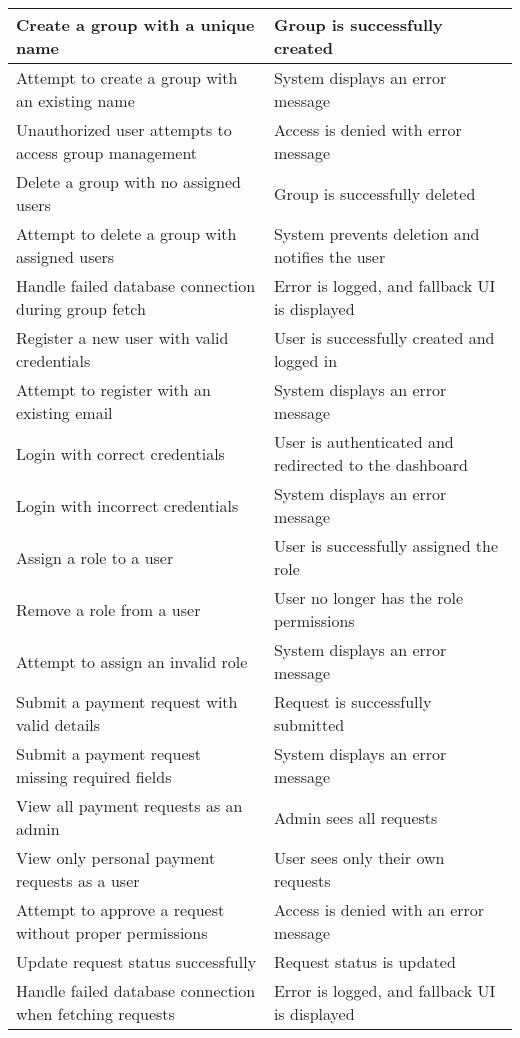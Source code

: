 \documentclass[12pt, titlepage]{article}
\begin{document}
\begin{longtable}{|p{}|p{}|}
  Create a group with a unique name & Group is successfully created \\
  \hline
  Attempt to create a group with an existing name & System displays an error message \\
  \hline
  Unauthorized user attempts to access group management & Access is denied with error message \\
  \hline
  Delete a group with no assigned users & Group is successfully deleted \\
  \hline
  Attempt to delete a group with assigned users & System prevents deletion and notifies the user \\
  \hline
  Handle failed database connection during group fetch & Error is logged, and fallback UI is displayed \\
  \hline
  Register a new user with valid credentials & User is successfully created and logged in \\
  \hline
  Attempt to register with an existing email & System displays an error message \\
  \hline
  Login with correct credentials & User is authenticated and redirected to the dashboard \\
  \hline
  Login with incorrect credentials & System displays an error message \\
  \hline
  Assign a role to a user & User is successfully assigned the role \\
  \hline
  Remove a role from a user & User no longer has the role permissions \\
  \hline
  Attempt to assign an invalid role & System displays an error message \\
  \hline
  Submit a payment request with valid details & Request is successfully submitted \\
  \hline
  Submit a payment request missing required fields & System displays an error message \\
  \hline
  View all payment requests as an admin & Admin sees all requests \\
  \hline
  View only personal payment requests as a user & User sees only their own requests \\
  \hline
  Attempt to approve a request without proper permissions & Access is denied with an error message \\
  \hline
  Update request status successfully & Request status is updated \\
  \hline
  Handle failed database connection when fetching requests & Error is logged, and fallback UI is displayed \\
  \hline
  
  \end{longtable}
\end{document}
